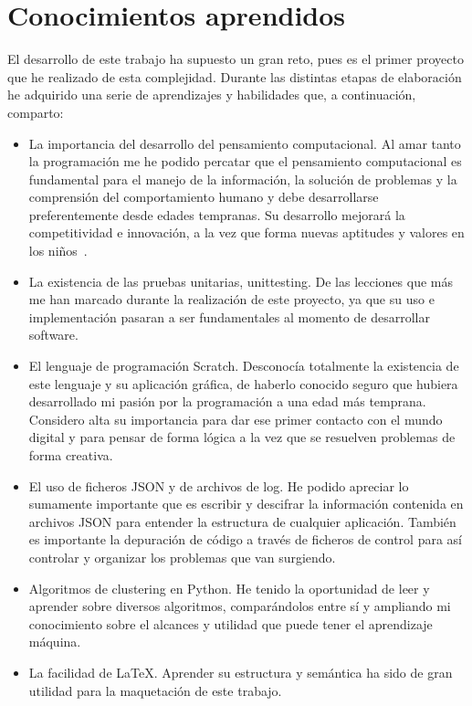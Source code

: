 \documentclass[a4paper, 12pt]{book}
\begin{document}
\section{Conocimientos aprendidos}
\label{sec:aprendizaje}

El desarrollo de este trabajo ha supuesto un gran reto, pues es el primer proyecto que he realizado de esta complejidad. Durante las distintas etapas de elaboración he adquirido una serie de aprendizajes y habilidades que, a continuación, comparto:

\begin{itemize}
\item La importancia del desarrollo del pensamiento computacional. Al amar tanto la programación me he podido percatar que el pensamiento computacional es fundamental para el manejo de la información, la solución de problemas y la comprensión del comportamiento humano y debe desarrollarse preferentemente desde edades tempranas. Su desarrollo mejorará la competitividad e innovación, a la vez que forma nuevas aptitudes y valores en los niños~\cite{wing_socialissues}.
\item La existencia de las pruebas unitarias, unittesting. De las lecciones que más me han marcado durante la realización de este proyecto, ya que su uso e implementación pasaran a ser fundamentales al momento de desarrollar software.
\item El lenguaje de programación Scratch. Desconocía totalmente la existencia de este lenguaje y su aplicación gráfica, de haberlo conocido seguro que hubiera desarrollado mi pasión por la programación a una edad más temprana. Considero alta su importancia para dar ese primer contacto con el mundo digital y para pensar de forma lógica a la vez que se resuelven problemas de forma creativa.
\item El uso de ficheros JSON y de archivos de log. He podido apreciar lo sumamente importante que es escribir y descifrar la información contenida en archivos JSON para entender la estructura de cualquier aplicación. También es importante la depuración de código a través de ficheros de control para así controlar y organizar los problemas que van surgiendo.  
\item Algoritmos de clustering en Python. He tenido la oportunidad de leer y aprender sobre diversos algoritmos, comparándolos entre sí y ampliando mi conocimiento sobre el alcances y utilidad que puede tener el aprendizaje máquina. 
\item La facilidad de \LaTeX. Aprender su estructura y semántica ha sido de gran utilidad para la maquetación de este trabajo.
\end{itemize}
\end{document}
